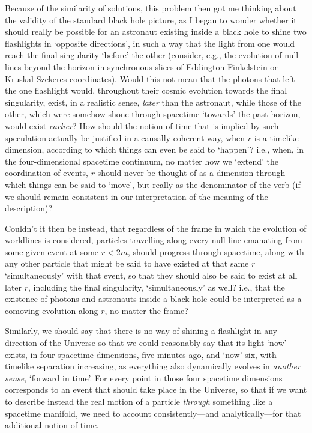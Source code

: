 Because of the similarity of solutions, this problem then got me thinking about the validity of the standard black hole picture, as I began to wonder whether it should really be possible for an astronaut existing inside a black hole to shine two flashlights in `opposite directions', in such a way that the light from one would reach the final singularity `before' the other (consider, e.g., the evolution of null lines beyond the horizon in synchronous slices of Eddington-Finkelstein or Kruskal-Szekeres coordinates). Would this not mean that the photons that left the one flashlight would, throughout their cosmic evolution towards the final singularity, exist, in a realistic sense, \textit{later} than the astronaut, while those of the other, which were somehow shone through spacetime `towards' the past horizon, would exist \textit{earlier}? How should the notion of time that is implied by such speculation actually be justified in a causally coherent way, when $r$ is a timelike dimension, according to which things can even be said to `happen'? i.e., when, in the four-dimensional spacetime continuum, no matter how we `extend' the coordination of events, $r$ should never be thought of as a dimension through which things can be said to `move', but really as the denominator of the verb (if we should remain consistent in our interpretation of the meaning of the description)? 

Couldn't it then be instead, that regardless of the frame in which the evolution of worldlines is considered, particles travelling along every null line emanating from some given event at some $r<2m$, should progress through spacetime, along with any other particle that might be said to have existed at that same $r$ `simultaneously' with that event, so that they should also be said to exist at all later $r$, including the final singularity, `simultaneously' as well? i.e., that the existence of photons and astronauts inside a black hole could be interpreted as a comoving evolution along $r$, no matter the frame?

Similarly, we should say that there is no way of shining a flashlight in any direction of the Universe so that we could reasonably say that its light `now' exists, in four spacetime dimensions, five minutes ago, and `now' six, with timelike separation increasing, as everything also dynamically evolves in \textit{another sense}, `forward in time'. For every point in those four spacetime dimensions corresponds to an event that should take place in the Universe, so that if we want to describe instead the real motion of a particle \textit{through} something like a spacetime manifold, we need to account consistently---and analytically---for that additional notion of time.


